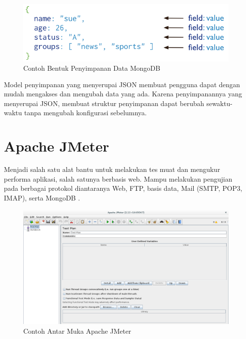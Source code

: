 \documentclass{ta-its}
\begin{document}
			\begin{figure}[h] %
				\centering
				\includegraphics[width=\linewidth]{contoh_img/contoh_mongodb}
				\caption{Contoh Bentuk Penyimpanan Data MongoDB}
				\label{contohMongoDB}
			\end{figure}
			
			Model penyimpanan yang menyerupai JSON membuat pengguna dapat dengan mudah mengakses dan mengubah data yang ada. Karena penyimpanannya yang menyerupai JSON, membuat struktur penyimpanan dapat berubah sewaktu-waktu tanpa mengubah konfigurasi sebelumnya.
		
		\section{Apache JMeter}
			Menjadi salah satu alat bantu untuk melakukan tes muat dan mengukur performa aplikasi, salah satunya berbasis web. Mampu melakukan pengujian pada berbagai protokol diantaranya Web, FTP, basis data, Mail (SMTP, POP3, IMAP), serta MongoDB \cite{JMeter}.
			
			\begin{figure}[h] %
				\centering
				\includegraphics[width=\linewidth]{contoh_img/contoh_jmeter}
				\caption{Contoh Antar Muka Apache JMeter}
				\label{contohJMeter}
			\end{figure}
			
\end{document}
